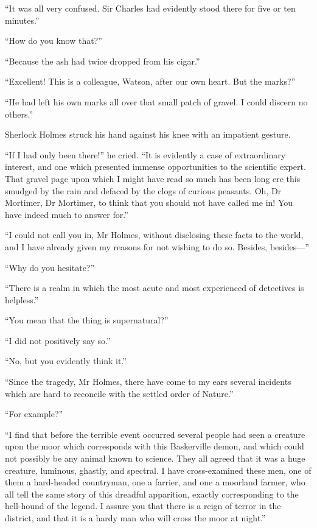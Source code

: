 \documentclass[paper=5.5in:8.5in,BCOR=7mm,twoside,DIV=calc,12pt,usegeometry,openany,chapterprefix,endperiod,headings=big]{scrbook} %
\begin{document}
\enquote{It was all very confused. Sir Charles had evidently stood there for five or ten minutes.}

\enquote{How do you know that?}

\enquote{Because the ash had twice dropped from his cigar.}

\enquote{Excellent! This is a colleague, Watson, after our own heart. But the marks?}

\enquote{He had left his own marks all over that small patch of gravel. I could discern no others.}

Sherlock Holmes struck his hand against his knee with an impatient gesture.

\enquote{If I had only been there!} he cried. \enquote{It is evidently a case of extraordinary interest, and one which presented immense opportunities to the scientific expert. That gravel page upon which I might have read so much has been long ere this smudged by the rain and defaced by the clogs of curious peasants. Oh, Dr Mortimer, Dr Mortimer, to think that you should not have called me in! You have indeed much to answer for.}

%

\enquote{I could not call you in, Mr Holmes, without disclosing these facts to the world, and I have already given my reasons for not wishing to do so. Besides, besides---}

\enquote{Why do you hesitate?}

\enquote{There is a realm in which the most acute and most experienced of detectives is helpless.}

\enquote{You mean that the thing is supernatural?}

\enquote{I did not positively say so.}

\enquote{No, but you evidently think it.}

\enquote{Since the tragedy, Mr Holmes, there have come to my ears several incidents which are hard to reconcile with the settled order of Nature.}

\enquote{For example?}

\enquote{I find that before the terrible event occurred several people had seen a creature upon the moor which corresponds with this Baskerville demon, and which could not possibly be any animal known to science. They all agreed that it was a huge creature, luminous, ghastly, and spectral. I have cross-examined these men, one of them a hard-headed countryman, one a farrier, and one a moorland farmer, who all tell the same story of this dreadful apparition, exactly corresponding to the hell-hound of the legend. I assure you that there is a reign of terror in the district, and that it is a hardy man who will cross the moor at night.}
\end{document}
